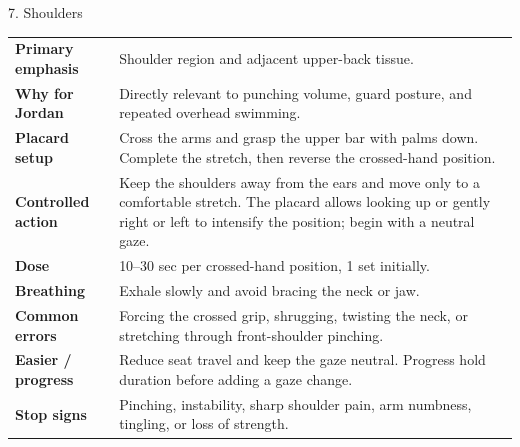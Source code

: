 \documentclass[10pt,letterpaper]{article}
\begin{document}
\begin{stretchbox}{7. Shoulders}
\begin{tabularx}{\textwidth}{@{}L{1.28in}Y@{}}
\textbf{Primary emphasis} & Shoulder region and adjacent upper-back tissue. \\
\textbf{Why for Jordan} & Directly relevant to punching volume, guard posture, and repeated overhead swimming. \\
\textbf{Placard setup} & Cross the arms and grasp the upper bar with palms down. Complete the stretch, then reverse the crossed-hand position. \\
\textbf{Controlled action} & Keep the shoulders away from the ears and move only to a comfortable stretch. The placard allows looking up or gently right or left to intensify the position; begin with a neutral gaze. \\
\textbf{Dose} & 10--30 sec per crossed-hand position, 1 set initially. \\
\textbf{Breathing} & Exhale slowly and avoid bracing the neck or jaw. \\
\textbf{Common errors} & Forcing the crossed grip, shrugging, twisting the neck, or stretching through front-shoulder pinching. \\
\textbf{Easier / progress} & Reduce seat travel and keep the gaze neutral. Progress hold duration before adding a gaze change. \\
\textbf{Stop signs} & Pinching, instability, sharp shoulder pain, arm numbness, tingling, or loss of strength. \\
\end{tabularx}
\end{stretchbox}
\end{document}
